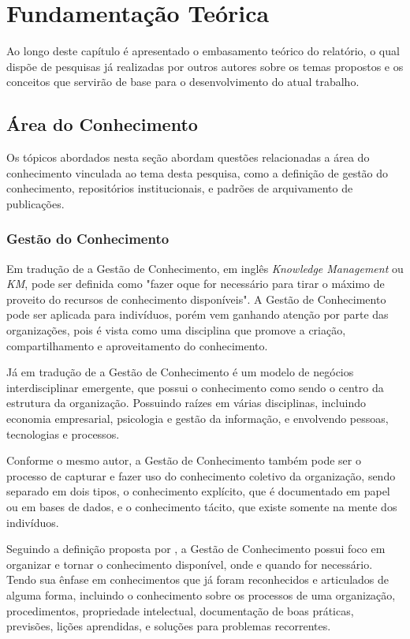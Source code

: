 
\chapter{Fundamentação Teórica}\label{chap:background}

Ao longo deste capítulo é apresentado o embasamento teórico do relatório,
o qual dispõe de pesquisas já realizadas por outros autores sobre os temas
propostos e os conceitos que servirão de base para o desenvolvimento do
atual trabalho.

\section{Área do Conhecimento}\label{sec:business}

Os tópicos abordados nesta seção abordam questões relacionadas
a área do conhecimento vinculada ao tema desta pesquisa, como a
definição de gestão do conhecimento, repositórios institucionais,
e padrões de arquivamento de publicações.

\subsection{Gestão do Conhecimento}
Em tradução de \cite[p. 4]{2014:Becerra} a Gestão de Conhecimento,
em inglês \emph{Knowledge Management} ou \emph{KM}, pode ser definida
como "fazer oque for necessário para tirar o máximo de proveito do
recursos de conhecimento disponíveis". A Gestão de Conhecimento pode
ser aplicada para indivíduos, porém vem ganhando atenção por parte
das organizações, pois é vista como uma disciplina que promove
a criação, compartilhamento e aproveitamento do conhecimento.

Já em tradução de \citep[p. 26]{2007:Awad} a Gestão de Conhecimento
é um modelo de negócios interdisciplinar emergente, que possui
o conhecimento como sendo o centro da estrutura da organização.
Possuindo raízes em várias disciplinas, incluindo economia empresarial,
psicologia e gestão da informação, e envolvendo pessoas, tecnologias e
processos.

Conforme o mesmo autor, a Gestão de Conhecimento também pode ser
o processo de capturar e fazer uso do conhecimento coletivo da organização,
sendo separado em dois tipos, o conhecimento explícito, que é documentado
em papel ou em bases de dados, e o conhecimento tácito, que existe
somente na mente dos indivíduos.

Seguindo a definição proposta por \cite{2014:Becerra}, a
Gestão de Conhecimento possui foco em organizar e tornar o
conhecimento disponível, onde e quando for necessário.
Tendo sua ênfase em conhecimentos que já foram reconhecidos e
articulados de alguma forma, incluindo o conhecimento sobre os
processos de uma organização, procedimentos, propriedade intelectual,
documentação de boas práticas, previsões, lições aprendidas, e soluções
para problemas recorrentes.

